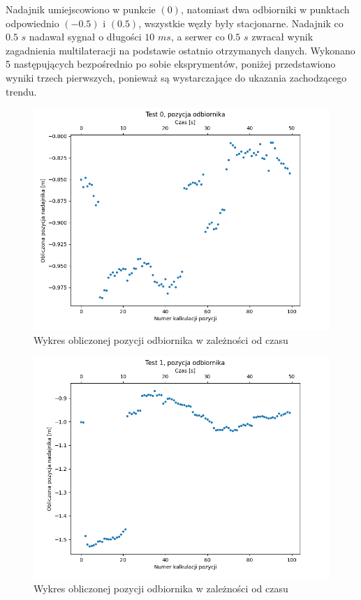 Nadajnik umiejscowiono w punkcie $(0)$, natomiast dwa odbiorniki w punktach odpowiednio $(-0.5)$ i $(0.5)$, wszystkie węzły były stacjonarne. Nadajnik co $0.5$ $s$ nadawał sygnał o długości $10$ $ms$, a serwer co $0.5$ $s$ zwracał wynik zagadnienia multilateracji na podstawie ostatnio otrzymanych danych. Wykonano 5 następujących bezpośrednio po sobie eksprymentów, poniżej przedstawiono wyniki trzech pierwszych, ponieważ są wystarczające do ukazania zachodzącego trendu.

\begin{figure}[h]
\centering
    \includegraphics[scale=0.6]{pics/position/position_0.png}
\caption{Wykres obliczonej pozycji odbiornika w zależności od czasu}
\label{fig:position_0}
\end{figure}

\begin{figure}[h]
\centering
    \includegraphics[scale=0.6]{pics/position/position_1.png}
\caption{Wykres obliczonej pozycji odbiornika w zależności od czasu}
\label{fig:position_1}
\end{figure}

